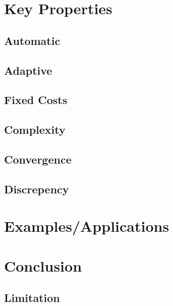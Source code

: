 \documentclass[acmtoms]{doc_acmtrans2m}
\begin{document}
\section{Key Properties}\label{sec:prop}
\subsection{Automatic}

\subsection{Adaptive}

\subsection{Fixed Costs}

\subsection{Complexity}

\subsection{Convergence}

\subsection{Discrepency} 





\section{Examples/Applications}
\label{sec:ex}
  
  
\section{Conclusion}
\label{sec:con}

 
\subsection{Limitation}
\end{document}

